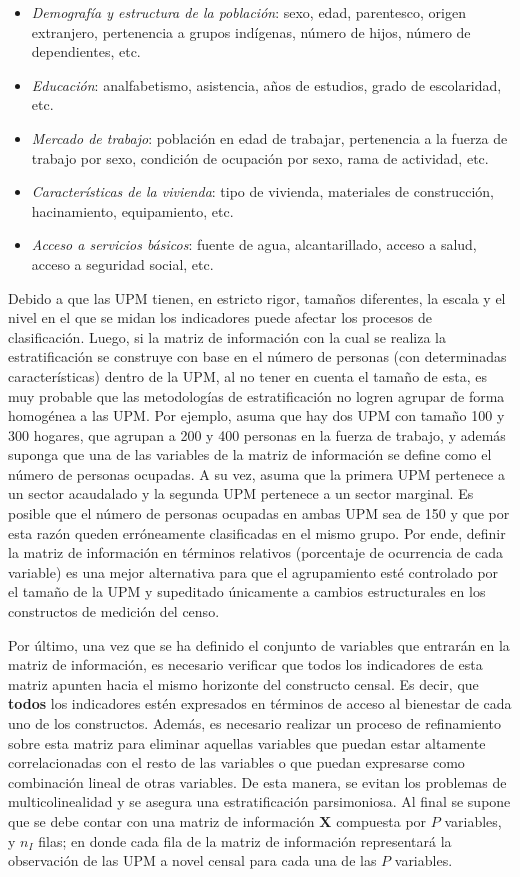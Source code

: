 \documentclass[
  12pt,
  spanish,
]{book}
\providecommand{\tightlist}{%
  \setlength{\itemsep}{0pt}\setlength{\parskip}{0pt}}
\begin{document}
\begin{itemize}
\tightlist
\item
  \emph{Demografía y estructura de la población}: sexo, edad, parentesco, origen extranjero, pertenencia a grupos indígenas, número de hijos, número de dependientes, etc.
\item
  \emph{Educación}: analfabetismo, asistencia, años de estudios, grado de escolaridad, etc.
\item
  \emph{Mercado de trabajo}: población en edad de trabajar, pertenencia a la fuerza de trabajo por sexo, condición de ocupación por sexo, rama de actividad, etc.
\item
  \emph{Características de la vivienda}: tipo de vivienda, materiales de construcción, hacinamiento, equipamiento, etc.
\item
  \emph{Acceso a servicios básicos}: fuente de agua, alcantarillado, acceso a salud, acceso a seguridad social, etc.
\end{itemize}

Debido a que las UPM tienen, en estricto rigor, tamaños diferentes, la escala y el nivel en el que se midan los indicadores puede afectar los procesos de clasificación. Luego, si la matriz de información con la cual se realiza la estratificación se construye con base en el número de personas (con determinadas características) dentro de la UPM, al no tener en cuenta el tamaño de esta, es muy probable que las metodologías de estratificación no logren agrupar de forma homogénea a las UPM. Por ejemplo, asuma que hay dos UPM con tamaño 100 y 300 hogares, que agrupan a 200 y 400 personas en la fuerza de trabajo, y además suponga que una de las variables de la matriz de información se define como el número de personas ocupadas. A su vez, asuma que la primera UPM pertenece a un sector acaudalado y la segunda UPM pertenece a un sector marginal. Es posible que el número de personas ocupadas en ambas UPM sea de 150 y que por esta razón queden erróneamente clasificadas en el mismo grupo. Por ende, definir la matriz de información en términos relativos (porcentaje de ocurrencia de cada variable) es una mejor alternativa para que el agrupamiento esté controlado por el tamaño de la UPM y supeditado únicamente a cambios estructurales en los constructos de medición del censo.

Por último, una vez que se ha definido el conjunto de variables que entrarán en la matriz de información, es necesario verificar que todos los indicadores de esta matriz apunten hacia el mismo horizonte del constructo censal. Es decir, que \textbf{todos} los indicadores estén expresados en términos de acceso al bienestar de cada uno de los constructos. Además, es necesario realizar un proceso de refinamiento sobre esta matriz para eliminar aquellas variables que puedan estar altamente correlacionadas con el resto de las variables o que puedan expresarse como combinación lineal de otras variables. De esta manera, se evitan los problemas de multicolinealidad y se asegura una estratificación parsimoniosa. Al final se supone que se debe contar con una matriz de información \(\mathbf{X}\) compuesta por \(P\) variables, y \(n_I\) filas; en donde cada fila de la matriz de información representará la observación de las UPM a novel censal para cada una de las \(P\) variables.
\end{document}
